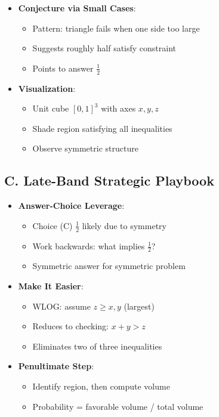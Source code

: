 \documentclass[11pt]{article}
\begin{document}
\begin{strategicbox}
\begin{itemize}[leftmargin=*]
    \item \textbf{Conjecture via Small Cases}: 
    \begin{itemize}
        \item Pattern: triangle fails when one side too large
        \item Suggests roughly half satisfy constraint
        \item Points to answer $\frac{1}{2}$
    \end{itemize}
    \item \textbf{Visualization}: 
    \begin{itemize}
        \item Unit cube $[0,1]^3$ with axes $x, y, z$
        \item Shade region satisfying all inequalities
        \item Observe symmetric structure
    \end{itemize}
\end{itemize}

\subsection*{C. Late-Band Strategic Playbook}
\begin{itemize}[leftmargin=*]
    \item \textbf{Answer-Choice Leverage}: 
    \begin{itemize}
        \item Choice (C) $\frac{1}{2}$ likely due to symmetry
        \item Work backwards: what implies $\frac{1}{2}$?
        \item Symmetric answer for symmetric problem
    \end{itemize}
    \item \textbf{Make It Easier}: 
    \begin{itemize}
        \item WLOG: assume $z \geq x, y$ (largest)
        \item Reduces to checking: $x+y>z$
        \item Eliminates two of three inequalities
    \end{itemize}
    \item \textbf{Penultimate Step}: 
    \begin{itemize}
        \item Identify region, then compute volume
        \item Probability = favorable volume / total volume
    \end{itemize}
\end{itemize}


\end{strategicbox}
\end{document}
